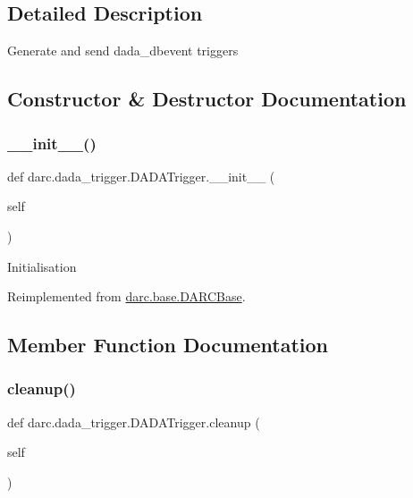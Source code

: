 \subsection{Detailed Description}
\begin{DoxyVerb}Generate and send dada_dbevent triggers
\end{DoxyVerb}
 

\subsection{Constructor \& Destructor Documentation}
\mbox{\label{classdarc_1_1dada__trigger_1_1_d_a_d_a_trigger_a329b9ddcd2774fda7129cbf74c9f9d5a}} 
\subsubsection{\texorpdfstring{\_\_init\_\_()}{\_\_init\_\_()}}
{\footnotesize\ttfamily def darc.\+dada\+\_\+trigger.\+D\+A\+D\+A\+Trigger.\+\_\+\+\_\+init\+\_\+\+\_\+ (\begin{DoxyParamCaption}\item[{}]{self }\end{DoxyParamCaption})}

\begin{DoxyVerb}Initialisation
\end{DoxyVerb}
 

Reimplemented from \mbox{\hyperlink{classdarc_1_1base_1_1_d_a_r_c_base_ac14d433a0b0c403939d6a2f8271f56b4}{darc.\+base.\+D\+A\+R\+C\+Base}}.



\subsection{Member Function Documentation}
\mbox{\label{classdarc_1_1dada__trigger_1_1_d_a_d_a_trigger_a05f2e958d523a2a75ca37df5a59696bc}} 
\subsubsection{\texorpdfstring{cleanup()}{cleanup()}}
{\footnotesize\ttfamily def darc.\+dada\+\_\+trigger.\+D\+A\+D\+A\+Trigger.\+cleanup (\begin{DoxyParamCaption}\item[{}]{self }\end{DoxyParamCaption})}

